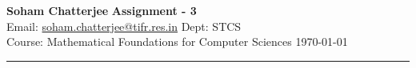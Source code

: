 \documentclass[a4paper, 11pt]{article}
\begin{document}
	
	
	{\noindent \large\textbf{Soham Chatterjee} \hfill \textbf{Assignment - 3}\\
		Email: \href{soham.chatterjee@tifr.res.in}{soham.chatterjee@tifr.res.in} \hfill Dept: STCS\\
		\normalsize Course: Mathematical Foundations for Computer Sciences \hfill \today\\ 
		\noindent\rule{7in}{2.8pt}}
	
	
\end{document}
